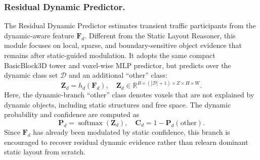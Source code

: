 \subsubsection{Residual Dynamic Predictor.}
\label{sec:prosd_dynamic_predictor}
The Residual Dynamic Predictor estimates transient traffic participants from
the dynamic-aware feature $\bm{F}_{d}$. Different from the Static Layout
Reasoner, this module focuses on local, sparse, and boundary-sensitive object
evidence that remains after static-guided modulation. It adopts the same
compact BasicBlock3D tower and voxel-wise MLP predictor, but predicts over the
dynamic class set $\mathcal{D}$ and an additional ``other'' class:
\begin{equation}
  \bm{Z}_{d}=h_d(\bm{F}_{d}),
  \quad
  \bm{Z}_{d}\in
  \mathbb{R}^{B\times(|\mathcal{D}|+1)\times Z\times H\times W} .
\end{equation}
Here, the dynamic-branch ``other'' class denotes voxels that are not explained
by dynamic objects, including static structures and free space. The dynamic
probability and confidence are computed as
\begin{equation}
  \bm{P}_{d}=\operatorname{softmax}(\bm{Z}_{d}),
  \quad
  \bm{C}_{d}=1-\bm{P}_{d}(\mathrm{other}).
\end{equation}
Since $\bm{F}_{d}$ has already been modulated by static confidence, this
branch is encouraged to recover residual dynamic evidence rather than relearn
dominant static layout from scratch.



